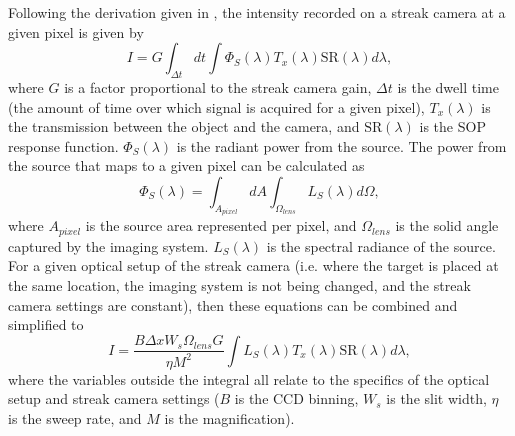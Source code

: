 Following the derivation given in \cite{Miller2007}, the intensity recorded on a streak camera at a given pixel is given by \begin{equation} I = G \int_{\Delta t} dt \int {\Phi_S(\lambda) T_x(\lambda) \text{SR}(\lambda) d\lambda}, \end{equation} where $G$ is a factor proportional to the streak camera gain, $\Delta t$ is the dwell time (the amount of time over which signal is acquired for a given pixel), $T_x(\lambda)$ is the transmission between the object and the camera, and $\text{SR}(\lambda)$ is the SOP response function. $\Phi_S(\lambda)$ is the radiant power from the source. The power from the source that maps to a given pixel can be calculated as 
\begin{equation} \Phi_S(\lambda) =  \int_{A_{pixel}}{ dA} \int_{\Omega_{lens}} { L_S(\lambda) d\Omega}, \end{equation}
where $A_{pixel}$ is the source area represented per pixel, and $\Omega_{lens}$ is the solid angle captured by the imaging system. $L_S (\lambda)$ is the spectral radiance of the source. For a given optical setup of the streak camera (i.e. where the target is placed at the same location, the imaging system is not being changed, and the streak camera settings are constant), then these equations can be combined and simplified to 
\begin{equation} I = \frac{B \Delta x W_s \Omega_{lens} G}{\eta M^2} \int {L_S(\lambda) T_x(\lambda)\text{SR}(\lambda) d\lambda}, \end{equation} where the variables outside the integral all relate to the specifics of the optical setup and streak camera settings ($B$ is the CCD binning, $W_s$ is the slit width, $\eta$ is the sweep rate, and $M$ is the magnification).

